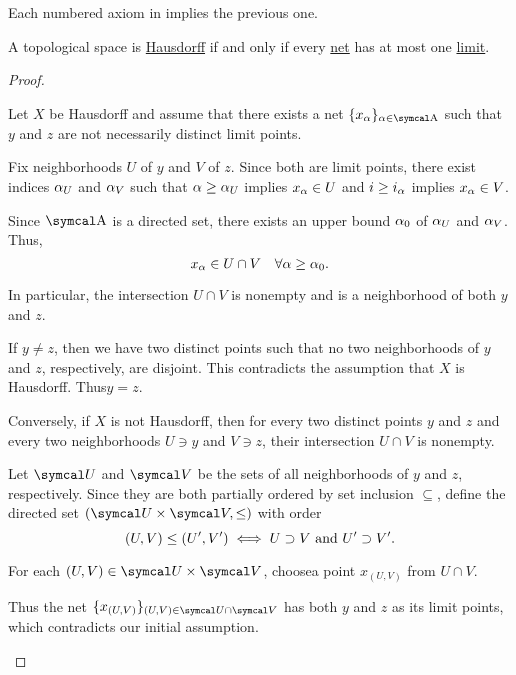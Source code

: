 \begin{proposition}\label{thm:separation_axioms_cascade}
  Each numbered axiom in  implies the previous one.
\end{proposition}

\begin{proposition}\label{thm:t2_iff_singleton_limits}
  A topological space is \hyperref[def:separation_axioms/T2]{Hausdorff} if and only if every \hyperref[def:topological_net]{net} has at most one \hyperref[def:net_convergence/limit]{limit}.
\end{proposition}
\begin{proof}\mbox{}
  \begin{description}
    \Implies Let \( X \) be Hausdorff and assume that there exists a net \( \{ x_\al \}_{\al \in \CA} \) such that \( y \) and \( z \) are not necessarily distinct limit points.

    Fix neighborhoods \( U \) of \( y \) and \( V \) of \( z \). Since both are limit points, there exist indices \( \alpha_U \) and \( \alpha_V \) such that \( \alpha \geq \alpha_U \) implies \( x_\alpha \in U \) and \( i \geq i_\alpha \) implies \( x_\alpha \in V \).

    Since \( \CA \) is a directed set, there exists an upper bound \( \alpha_0 \) of \( \alpha_U \) and \( \alpha_V \). Thus,
    \begin{equation*}
      x_\alpha \in U \cap V \quad\forall \alpha \geq \alpha_0.
    \end{equation*}

    In particular, the intersection \( U \cap V \) is nonempty and is a neighborhood of both \( y \) and \( z \).

    If \( y \neq z \), then we have two distinct points such that no two neighborhoods of \( y \) and \( z \), respectively, are disjoint. This contradicts the assumption that \( X \) is Hausdorff. Thus\LEM \( y = z \).

    \ImpliedBy Conversely, if \( X \) is not Hausdorff\LEM, then for every two distinct points \( y \) and \( z \) and every two neighborhoods \( U \ni y \) and \( V \ni z \), their intersection \( U \cap V \) is nonempty.

    Let \( \Cal{U} \) and \( \Cal{V} \) be the sets of all neighborhoods of \( y \) and \( z \), respectively. Since they are both partially ordered by set inclusion \( \subseteq \), define the directed set \( (\Cal{U} \times \Cal{V}, \leq) \) with order
    \begin{equation*}
      (U, V) \leq (U', V') \iff U \supset V \text{ and } U' \supset V'.
    \end{equation*}

    For each \( (U, V) \in \Cal{U} \times \Cal{V} \), choose\AOC a point \( x_{(U, V)} \) from \( U \cap V \).

    Thus the net \( \{ x_{(U, V)} \}_{(U, V) \in \Cal{U} \cap \Cal{V}} \) has both \( y \) and \( z \) as its limit points, which contradicts our initial assumption.
  \end{description}
\end{proof}


